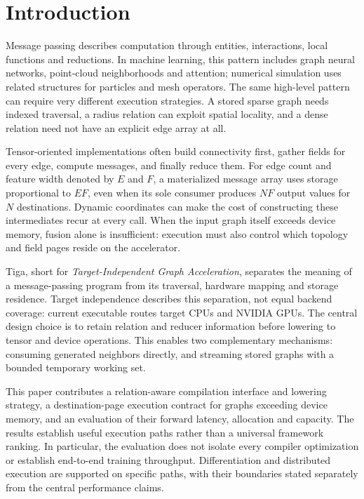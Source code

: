 \section{Introduction}
Message passing describes computation through entities, interactions, local
functions and reductions. In machine learning, this pattern includes graph
neural networks, point-cloud neighborhoods and attention; numerical simulation
uses related structures for particles and mesh operators. The same high-level
pattern can require very different execution strategies. A stored sparse graph
needs indexed traversal, a radius relation can exploit spatial locality, and
a dense relation need not have an explicit edge array at all.

Tensor-oriented implementations often build connectivity first, gather fields
for every edge, compute messages, and finally reduce them. For edge count
and feature width denoted by $E$ and $F$, a materialized message array uses
storage proportional to $EF$, even when its sole consumer produces $NF$
output values for $N$ destinations. Dynamic coordinates can make the cost of
constructing these intermediates recur at every call. When the input graph
itself exceeds device memory, fusion alone is insufficient: execution must
also control which topology and field pages reside on the accelerator.

Tiga, short for \emph{Target-Independent Graph Acceleration}, separates the
meaning of a message-passing program from its traversal, hardware mapping and
storage residence. Target independence describes this separation, not equal
backend coverage: current executable routes target CPUs and NVIDIA GPUs.
The central design choice is to retain relation and reducer information before
lowering to tensor and device operations. This enables two complementary
mechanisms: consuming generated neighbors directly, and streaming stored
graphs with a bounded temporary working set.

This paper contributes a relation-aware compilation interface and lowering
strategy, a destination-page execution contract for graphs exceeding device
memory, and an evaluation of their forward latency, allocation and capacity.
The results establish useful execution paths rather than a universal framework
ranking. In particular, the evaluation does not isolate every compiler
optimization or establish end-to-end training throughput. Differentiation and
distributed execution are supported on specific paths, with their boundaries
stated separately from the central performance claims.


